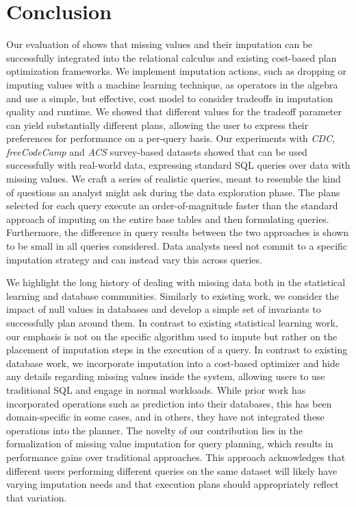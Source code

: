 \section{Conclusion}
Our evaluation of \ProjectName{} shows that missing values and their imputation can be successfully integrated into the relational calculus and
existing cost-based plan optimization frameworks. We implement imputation actions, such as dropping or imputing values with a machine
learning technique, as operators in the algebra and use a simple, but effective, cost model to consider tradeoffs in 
imputation quality and runtime. We showed that different values for the tradeoff parameter can yield substantially
different plans, allowing the user to express their preferences for performance on a per-query basis.
Our experiments with \textit{CDC}, \textit{freeCodeCamp} and \textit{ACS} survey-based datasets
showed that \ProjectName{} can be used successfully with real-world data, expressing standard SQL queries over data with missing values. 
We craft a series of realistic queries, meant to resemble the kind of questions an analyst might ask during
the data exploration phase. The plans selected for each query execute an order-of-magnitude faster than
 the standard approach of imputing on the entire base tables and
then formulating queries. Furthermore, the difference in query results between the two approaches is
shown to be small in all queries considered. Data analysts need not commit to a specific imputation strategy and can instead
vary this across queries.

We highlight the long history of dealing with missing data both in the statistical learning and database communities.
Similarly to existing work, we consider the impact of null values in databases and develop a simple set of invariants to 
successfully plan around them. In contrast to existing statistical learning work, our emphasis is not on the specific algorithm
used to impute but rather on the placement of imputation steps in the execution of a query. In contrast to existing database work,
we incorporate imputation into a cost-based optimizer and hide any details
regarding missing values inside the system, allowing users to use traditional SQL and engage in normal workloads.
While prior work has incorporated operations such as prediction into their databases, this has been domain-specific
in some cases, and in others, they have not integrated these operations into the planner. The novelty
of our contribution lies in the formalization of missing value imputation for query planning, which results in performance
gains over traditional approaches. This approach acknowledges that different users performing different queries on the same
dataset will likely have varying imputation needs and that execution plans should appropriately reflect that variation.

